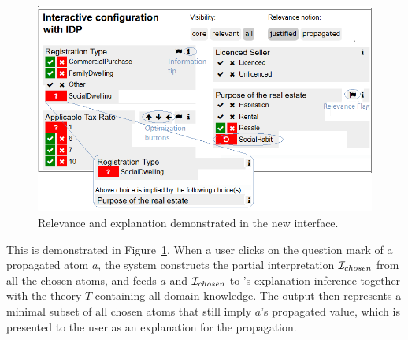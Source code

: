 \begin{figure}[]
	\includegraphics[angle=0,width = 1 \columnwidth]{img/26102018quat.png} %
	\caption{Relevance and explanation demonstrated in the new interface.}
	\label{fig:relevance}
\end{figure}
This is demonstrated in Figure~\ref{fig:relevance}.
When a user clicks on the question mark of a propagated atom $a$, the system constructs the partial interpretation $\mathcal{I}_{chosen}$ from all the chosen atoms, and feeds $a$ and $\mathcal{I}_{chosen}$ to \idp's explanation inference together with the theory $T$ containing all domain knowledge. The output then represents a minimal subset of all chosen atoms that still imply $a$'s propagated value, which is presented to the user as an explanation for the propagation.

